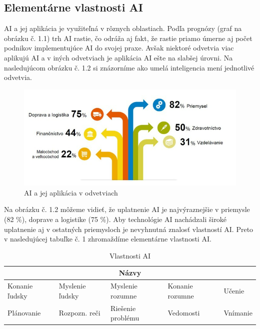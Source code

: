 
\subsection{Elementárne vlastnosti AI}

AI a jej aplikácia je využiteľná v rôznych oblastiach. Podľa prognózy (graf na obrázku č. 1.1) trh AI rastie, čo odráža aj fakt, že rastie priamo úmerne aj počet podnikov implementujúce AI do svojej praxe. Avšak niektoré odvetvia viac aplikujú AI a v iných odvetviach je aplikácia AI ešte na slabšej úrovni. Na nasledujúcom obrázku č. 1.2 si znázorníme ako umelá inteligencia mení jednotlivé odvetvia.

\begin{figure}[!ht]
    \centering
    \includegraphics[width=1\textwidth]{figures/AI-a-jej-aplikacia-v-odvetviach.png}
    \caption{AI a jej aplikácia v odvetviach}
\end{figure}

Na obrázku č. 1.2 môžeme vidieť, že uplatnenie AI je najvýraznejšie v priemysle (82 \%), doprave a logistike (75 \%). Aby technológie AI nachádzali široké uplatnenie aj v ostatných priemysloch je nevyhnutná znalosť vlastností AI.
Preto v nasledujúcej tabuľke č. 1 zhromaždíme elementárne vlastnosti AI.



\begin{table}[!ht]
    \centering
    \begin{tabular}{|p{2.5cm}|p{2.5cm}|p{2.5cm}|p{2.5cm}|p{2.5cm}|}
    \hline
       \multicolumn{5}{|c|}{Názvy} \\ \hline
        Konanie ľudsky & Myslenie ľudsky & Myslenie rozumne & Konanie rozumne & Učenie   \\ \hline
        Plánovanie  & Rozpozn. reči & Riešenie problému & Vedomosti  & Vnímanie   \\ \hline
    \end{tabular}
    \caption{\label{table1}Vlastnosti AI}
\end{table}

